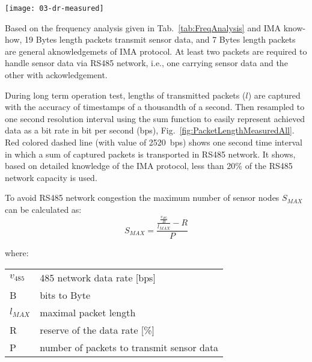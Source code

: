 \begin{figure*}[ht]
    \centering
    \texttt{[image: 03-dr-measured]}
    \caption{Measured data rate in [bps] in RS485 network during long-term operation test}
    \label{fig:PacketLengthMeasuredAll}
\end{figure*}

Based on the frequency analysis given in Tab.~\ref{tab:FreqAnalysis} and IMA know-how, 19 Bytes length packets transmit sensor data, and 7 Bytes length packets are general aknowledgemets of IMA protocol. At least two packets are required to handle sensor data via RS485 network, i.e., one carrying sensor data and the other with ackowledgement.


During long term operation test, lengths of transmitted packets ($ l $) are captured with the accuracy of timestamps of a thousandth of a second. Then resampled to one second resolution interval using the sum function to easily represent achieved data as a bit rate in bit per second (bps),
Fig.~\ref{fig:PacketLengthMeasuredAll}.
Red colored dashed line (with value of 2520~bps) shows one second time interval in which a sum of captured packets is transported in RS485 network. It shows, based on detailed knowledge of the IMA protocol, less than 20\% of the RS485 network capacity is used. 

To avoid RS485 network congestion the maximum number of sensor nodes $ S_{MAX} $ can be calculated as:
\begin{equation}
S_{MAX} = \frac{\frac{\frac{v_{485}}{B}}{l_{MAX}} - R}{P}
\label{equ:max-count-of-sensors}
\end{equation}

where:

\begin{tabular}{l @{  } l}
$v_{485}$ & 485 network data rate [bps]\\
 B        & bits to Byte \\
$l_{MAX}$ & maximal packet length \\
 R        & reserve of the data rate [\%]\\
 P        & number of packets to transmit sensor data \\
\end{tabular}

